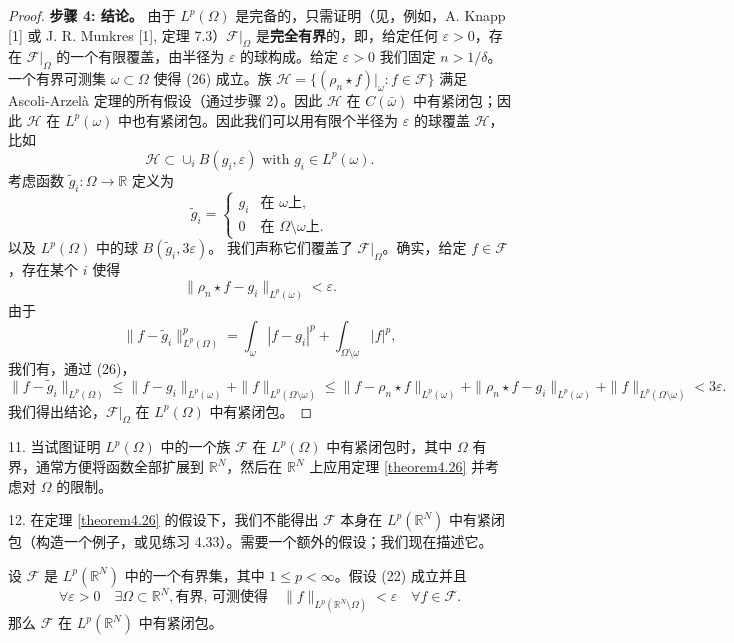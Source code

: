 \begin{proof}
\textbf{步骤 4: 结论。} 由于 $L^p(\Omega)$ 是完备的，只需证明（见，例如，A. Knapp [1] 或 J. R. Munkres [1], 定理 7.3）$\mathcal{F}|_\Omega$ 是\textbf{完全有界}的，即，给定任何 $\varepsilon>0$，存在 $\mathcal{F}|_\Omega$ 的一个有限覆盖，由半径为 $\varepsilon$ 的球构成。给定 $\varepsilon>0$ 我们固定 $n > 1/\delta$。
一个有界可测集 $\omega \subset \Omega$ 使得 (26) 成立。族 $\mathcal{H} = \{(\rho_n \star f)|_\omega : f \in \mathcal{F}\}$ 满足 Ascoli-Arzelà 定理的所有假设（通过步骤 2）。因此 $\mathcal{H}$ 在 $C(\bar{\omega})$ 中有紧闭包；因此 $\mathcal{H}$ 在 $L^p(\omega)$ 中也有紧闭包。因此我们可以用有限个半径为 $\varepsilon$ 的球覆盖 $\mathcal{H}$，比如
\[ \mathcal{H} \subset \cup_i B(g_i, \varepsilon) \text{ with } g_i \in L^p(\omega). \]
考虑函数 $\tilde{g}_i: \Omega \to \mathbb{R}$ 定义为
\[ \tilde{g}_i = \begin{cases} g_i & \text{在 } \omega \text{上}, \\ 0 & \text{在 } \Omega \setminus \omega \text{上}. \end{cases} \]
以及 $L^p(\Omega)$ 中的球 $B(\tilde{g}_i, 3\varepsilon)$。
我们声称它们覆盖了 $\mathcal{F}|_\Omega$。确实，给定 $f \in \mathcal{F}$，存在某个 $i$ 使得
\[ \|\rho_n \star f - g_i\|_{L^p(\omega)} < \varepsilon. \]
由于
\[ \|f - \tilde{g}_i\|_{L^p(\Omega)}^p = \int_\omega |f-g_i|^p + \int_{\Omega \setminus \omega} |f|^p, \]
我们有，通过 (26)，
\[ \|f - \tilde{g}_i\|_{L^p(\Omega)} \le \|f-g_i\|_{L^p(\omega)} + \|f\|_{L^p(\Omega \setminus \omega)} \le \|f - \rho_n \star f\|_{L^p(\omega)} + \|\rho_n \star f - g_i\|_{L^p(\omega)} + \|f\|_{L^p(\Omega \setminus \omega)} < 3\varepsilon. \]
我们得出结论，$\mathcal{F}|_\Omega$ 在 $L^p(\Omega)$ 中有紧闭包。
\end{proof}

\begin{remark}
11. 当试图证明 $L^p(\Omega)$ 中的一个族 $\mathcal{F}$ 在 $L^p(\Omega)$ 中有紧闭包时，其中 $\Omega$ 有界，通常方便将函数全部扩展到 $\mathbb{R}^N$，然后在 $\mathbb{R}^N$ 上应用定理 \ref{theorem4.26} 并考虑对 $\Omega$ 的限制。
\end{remark}

\begin{remark}
12. 在定理 \ref{theorem4.26} 的假设下，我们不能得出 $\mathcal{F}$ 本身在 $L^p(\mathbb{R}^N)$ 中有紧闭包（构造一个例子，或见练习 4.33）。需要一个额外的假设；我们现在描述它。
\end{remark}

\begin{corollary}\label{corollary4.27}
设 $\mathcal{F}$ 是 $L^p(\mathbb{R}^N)$ 中的一个有界集，其中 $1 \le p < \infty$。假设 (22) 成立并且
\begin{equation}\label{eq:corollary_4.27}
\forall \varepsilon > 0 \quad \exists \Omega \subset \mathbb{R}^N, \text{有界, 可测使得} \quad \|f\|_{L^p(\mathbb{R}^N \setminus \Omega)} < \varepsilon \quad \forall f \in \mathcal{F}. \tag{27}
\end{equation}
那么 $\mathcal{F}$ 在 $L^p(\mathbb{R}^N)$ 中有紧闭包。
\end{corollary}

